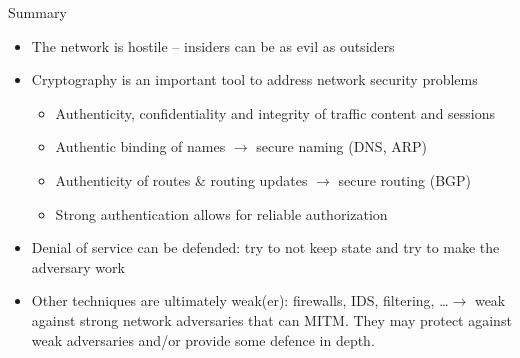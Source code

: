 \begin{parag}{Summary}
    \begin{itemize}
	    \item The network is hostile -- insiders can be as evil as outsiders
	    \item Cryptography is an important tool to address network security problems
			\begin{itemize}
			    \item Authenticity, confidentiality and integrity of traffic content and sessions
			    \item Authentic binding of names $\to$ secure naming (DNS, ARP)
			    \item Authenticity of routes \& routing updates $\to$ secure routing (BGP)
			    \item Strong authentication allows for reliable authorization
			\end{itemize}
	    \item Denial of service can be defended: try to not keep state and try to make the adversary work
	    \item Other techniques are ultimately weak(er): firewalls, IDS, filtering, \dots $\to$ weak against strong network adversaries that can MITM. They may protect against weak adversaries and/or provide some defence in depth.
	\end{itemize}
\end{parag}




























